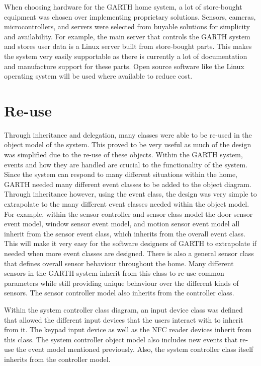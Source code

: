 \documentclass{report}
\begin{document}
When choosing hardware for the GARTH home system, a lot of store-bought
equipment was chosen over implementing proprietary solutions. Sensors, cameras,
microcontrollers, and servers were selected from buyable solutions for
simplicity and availability. For example, the main server that controls the
GARTH system and stores user data is a Linux server built from store-bought
parts.  This makes the system very easily supportable as there is currently a
lot of documentation and manufacture support for these parts. Open source
software like the Linux operating system will be used where available to reduce
cost.

\section{Re-use}

Through inheritance and delegation, many classes were able to be re-used in the
object model of the system. This proved to be very useful as much of the design
was simplified due to the re-use of these objects. Within the GARTH system,
events and how they are handled are crucial to the functionality of the system.
Since the system can respond to many different situations within the home,
GARTH needed many different event classes to be added to the object diagram.
Through inheritance however, using the event class, the design was very simple
to extrapolate to the many different event classes needed within the object
model. For example, within the sensor controller and sensor class model the
door sensor event model, window sensor event model, and motion sensor event
model all inherit from the sensor event class, which inherits from the overall
event class. This will make it very easy for the software designers of GARTH to
extrapolate if needed when more event classes are designed. There is also a
general sensor class that defines overall sensor behaviour throughout the home.
Many different sensors in the GARTH system inherit from this class to re-use
common parameters while still providing unique behaviour over the different
kinds of sensors. The sensor controller model also inherits from the controller
class.

Within the system controller class diagram, an input device class was defined
that allowed the different input devices that the users interact with to
inherit from it. The keypad input device as well as the NFC reader devices
inherit from this class. The system controller object model also includes new
events that re-use the event model mentioned previously. Also, the system
controller class itself inherits from the controller model.
\end{document}
